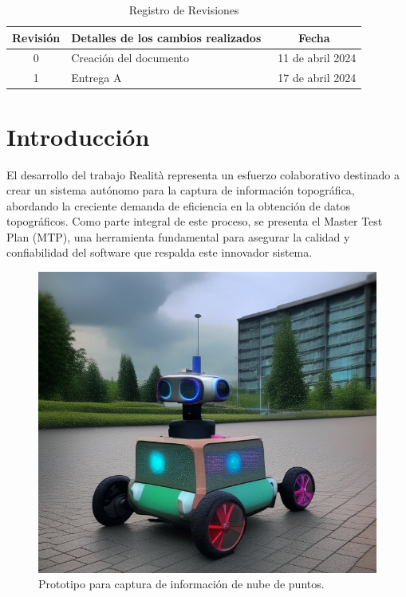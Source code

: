 \documentclass[12pt,a4paper, twoside]{article} %
\begin{document}
\begin{table}[ht]
  \centering
  \caption{Registro de Revisiones}
  \label{tab:registro}
  \begin{tabularx}{\linewidth}{|c|X|c|}
    \hline
    Revisión & Detalles de los cambios realizados & Fecha \\
    \hline
    0 & Creación del documento & \ 11 de abril 2024 \\
    \hline
    1 & Entrega A & \ 17 de abril 2024 \\
    \hline
  \end{tabularx}
\end{table}

\maketitle
\tableofcontents

\newpage

\section{Introducción}
\label{sec:org60390fa}

El desarrollo del trabajo Realità representa un esfuerzo colaborativo destinado a crear un sistema autónomo para la captura de información topográfica, abordando la creciente demanda de eficiencia en la obtención de datos topográficos. Como parte integral de este proceso, se presenta el Master Test Plan (MTP), una herramienta fundamental para asegurar la calidad y confiabilidad del software que respalda este innovador sistema.


\begin{figure}[htpb]
\centering
\includegraphics[width=1\textwidth]{./Figuras/Prototipo.png}
\caption{Prototipo para captura de información de nube de puntos.}
\label{fig:diagBloques}
\end{figure}
\end{document}

